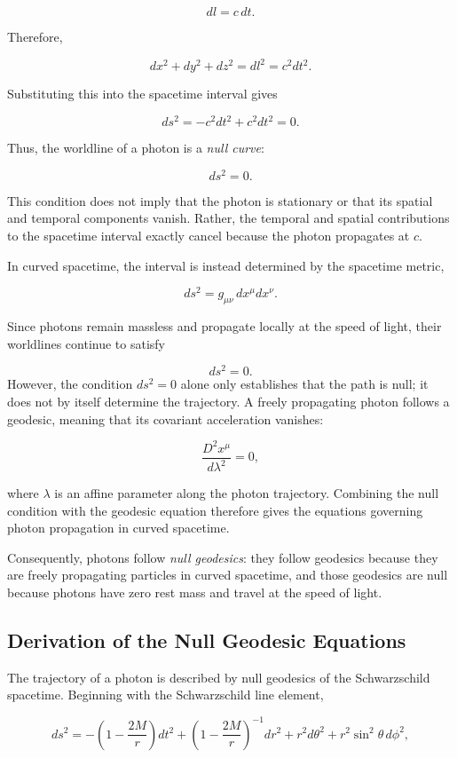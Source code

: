 \documentclass[12pt]{article}
\begin{document}
\begin{itemize}
\[
dl = c\,dt.
\]

Therefore,

\[
dx^2 + dy^2 + dz^2 = dl^2 = c^2dt^2.
\]

Substituting this into the spacetime interval gives

\[
ds^2 = -c^2dt^2 + c^2dt^2 = 0.
\]

Thus, the worldline of a photon is a \emph{null curve}:

\[
\boxed{ds^2=0}.
\]

This condition does not imply that the photon is stationary or that its spatial and temporal components vanish. Rather, the temporal and spatial contributions to the spacetime interval exactly cancel because the photon propagates at \(c\).

In curved spacetime, the interval is instead determined by the spacetime metric,

\[
ds^2 = g_{\mu\nu}\,dx^\mu dx^\nu.
\]

Since photons remain massless and propagate locally at the speed of light, their worldlines continue to satisfy

\[
\boxed{ds^2=0}.
\]
However, the condition \(ds^2=0\) alone only establishes that the path is null; it does not by itself determine the trajectory. A freely propagating photon follows a geodesic, meaning that its covariant acceleration vanishes:

\[
\frac{D^2x^\mu}{d\lambda^2}=0,
\]

where \(\lambda\) is an affine parameter along the photon trajectory. Combining the null condition with the geodesic equation therefore gives the equations governing photon propagation in curved spacetime.

Consequently, photons follow \emph{null geodesics}: they follow geodesics because they are freely propagating particles in curved spacetime, and those geodesics are null because photons have zero rest mass and travel at the speed of light.
    \subsection{Derivation of the Null Geodesic Equations}

The trajectory of a photon is described by null geodesics of the Schwarzschild spacetime. Beginning with the Schwarzschild line element,

\begin{equation}
ds^2=
-\left(1-\frac{2M}{r}\right)dt^2
+\left(1-\frac{2M}{r}\right)^{-1}dr^2
+r^2d\theta^2
+r^2\sin^2\theta\,d\phi^2,
\end{equation}


\end{itemize}
\end{document}
